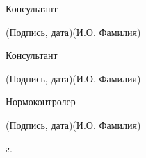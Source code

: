 \documentclass[14pt, russian]{scrartcl}
\begin{document}
\begin{titlepage}
\vspace{2ex}

\noindent Консультант \hfill \underline{\hspace{4cm}}\quad
\underline{\hspace{4cm}}

\vspace{-2ex}
\noindent\hspace{13.5ex}\normalsize\hspace{170pt}\hspace{2ex}\scriptsize{(Подпись, дата)}\normalsize\hspace{30pt}\hspace{6ex}\scriptsize{(И.О. Фамилия)}\normalsize
\bigskip

\noindent Консультант \hfill \underline{\hspace{4cm}}\quad
\underline{\hspace{4cm}}

\vspace{-2ex}
\noindent\hspace{13.5ex}\normalsize\hspace{170pt}\hspace{2ex}\scriptsize{(Подпись, дата)}\normalsize\hspace{30pt}\hspace{6ex}\scriptsize{(И.О. Фамилия)}\normalsize

\bigskip

\noindent Нормоконтролер \hfill \underline{\hspace{4cm}}\quad
\underline{\hspace{4cm}}

\vspace{-2ex}
\noindent\hspace{13.5ex}\normalsize\hspace{170pt}\hspace{2ex}\scriptsize{(Подпись, дата)}\normalsize\hspace{30pt}\hspace{6ex}\scriptsize{(И.О. Фамилия)}\normalsize
\vfill

 


\begin{center}
\textsl{\the\year{} г.}
\end{center}
\end{titlepage}


\setlength{\tabcolsep}{3pt}
\newpage
\setcounter{page}{4}
\end{document}
